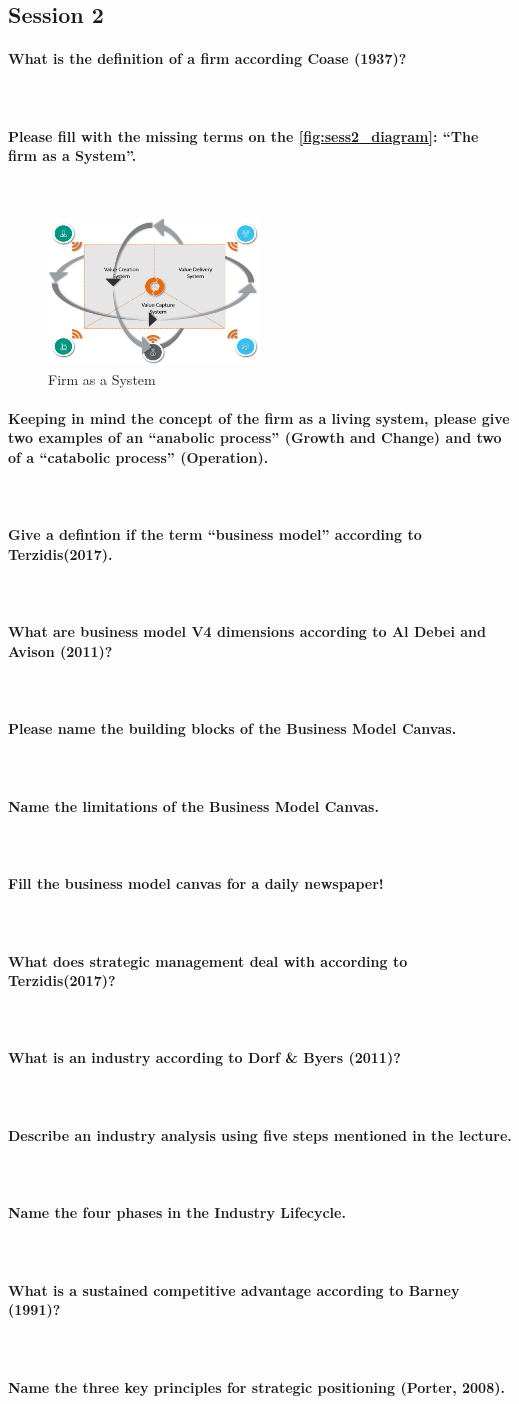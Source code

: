 \documentclass[10pt,a4paper,noendnumber=true]{scrartcl}
\newcommand{\properparagraph}[1]{\paragraph{\textcolor{Emerald}{#1}}\mbox{}\\}
\begin{document}
\subsection{Session 2}
\properparagraph{What is the definition of a firm according Coase (1937)?}
\properparagraph{Please fill with the missing terms on the \autoref{fig:sess2_diagram}: "`The firm as a System"'.}
\begin{figure}[H]
	\centering
	\includegraphics[width = 0.5\textwidth]{img/firm_system}
	\caption{Firm as a System} \label{fig:sess2_diagram}
\end{figure}
\properparagraph{Keeping in mind the concept of the firm as a living system, please give two examples of an "`anabolic process"' (Growth and Change) and two of a "`catabolic process"' (Operation).}
\properparagraph{Give a defintion if the term "`business model"' according to Terzidis(2017).}
\properparagraph{What are business model V4 dimensions according to Al Debei and Avison (2011)?}
\properparagraph{Please name the building blocks of the Business Model Canvas.}
\properparagraph{Name the limitations of the Business Model Canvas.}
\properparagraph{Fill the business model canvas for a daily newspaper!}
\properparagraph{What does strategic management deal with according to Terzidis(2017)?}
\properparagraph{What is an industry according to Dorf \& Byers (2011)?}
\properparagraph{Describe an industry analysis using five steps mentioned in the lecture.}
\properparagraph{Name the four phases in the Industry Lifecycle.}
\properparagraph{What is a sustained competitive advantage according to Barney (1991)?}
\properparagraph{Name the three key principles for strategic positioning (Porter, 2008).}
\end{document}
